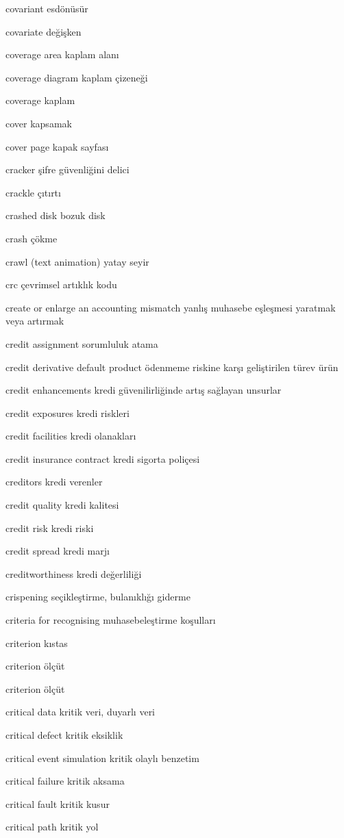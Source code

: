 \documentclass[12pt,fleqn]{article}\usepackage{../../common}
\begin{document}
covariant esdönüsür

covariate değişken

coverage area kaplam alanı

coverage diagram kaplam çizeneği

coverage kaplam

cover kapsamak

cover page kapak sayfası

cracker şifre güvenliğini delici

crackle çıtırtı

crashed disk bozuk disk

crash çökme

crawl (text animation) yatay seyir

crc çevrimsel artıklık kodu

create or enlarge an accounting mismatch yanlış muhasebe eşleşmesi yaratmak veya artırmak

credit assignment sorumluluk atama

credit derivative default product ödenmeme riskine karşı geliştirilen türev ürün

credit enhancements kredi güvenilirliğinde artış sağlayan unsurlar

credit exposures kredi riskleri

credit facilities kredi olanakları

credit insurance contract kredi sigorta poliçesi

creditors kredi verenler

credit quality kredi kalitesi

credit risk kredi riski

credit spread kredi marjı

creditworthiness kredi değerliliği

crispening seçikleştirme, bulanıklığı giderme

criteria for recognising muhasebeleştirme koşulları

criterion kıstas

criterion ölçüt

criterion ölçüt

critical data kritik veri, duyarlı veri

critical defect kritik eksiklik

critical event simulation kritik olaylı benzetim

critical failure kritik aksama

critical fault kritik kusur

critical path kritik yol
\end{document}
